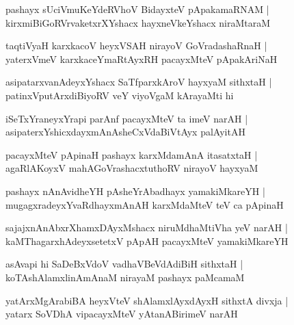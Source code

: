 \documentclass[twoside,12pt,openright]{book}
\newcounter{shloka}[chapter]
\begin{document}
\begin{shloka}%
pashayx sUciVmuKeYdeRVhoV BidayxteV pApakamaRNAM |\\
kirxmiBiGoRVrvaketxrXYshacx hayxneVkeYshacx niraMtaraM 
\end{shloka}

\begin{shloka}%
taqtiVyaH karxkacoV heyxVSAH nirayoV GoVradashaRnaH |\\
yaterxVmeV karxkaceYmaRtAyxRH pacayxMteV pApakAriNaH 
\end{shloka}

\begin{shloka}%
asipatarxvanAdeyxYshacx SaTfparxkAroV hayxyaM sithxtaH |\\
patinxVputArxdiBiyoRV veY viyoVgaM kArayaMti hi
\end{shloka}

\begin{shloka}%
iSeTxYraneyxYrapi parAnf pacayxMteV ta imeV narAH |\\
asipaterxYshicxdayxmAnAsheCxVdaBiVtAyx palAyitAH 
\end{shloka}

\begin{shloka}%
pacayxMteV pApinaH pashayx karxMdamAnA itasatxtaH |\\
agaRlAKoyxV mahAGoVrashacxtuthoRV nirayoV hayxyaM 
\end{shloka}

\begin{shloka}%
pashayx nAnAvidheYH pAsheYrAbadhayx yamakiMkareYH |\\
mugagxradeyxYvaRdhayxmAnAH karxMdaMteV teV ca pApinaH 
\end{shloka}

\begin{shloka}%
sajajxnAnAbxrXhamxDAyxMshacx niruMdhaMtiVha yeV narAH |\\
kaMThagarxhAdeyxsetetxV pApAH pacayxMteV yamakiMkareYH 
\end{shloka}

\begin{shloka}%
asAvapi hi SaDeBxVdoV vadhaVBeVdAdiBiH sithxtaH |\\
koTAshAlamxlinAmAnaM nirayaM pashayx paMcamaM
\end{shloka}

\begin{shloka}%
yatArxMgArabiBA heyxVteV shAlamxlAyxdAyxH sithxtA divxja |\\
yatarx SoVDhA vipacayxMteV yAtanABirimeV narAH 
\end{shloka}
\end{document}
